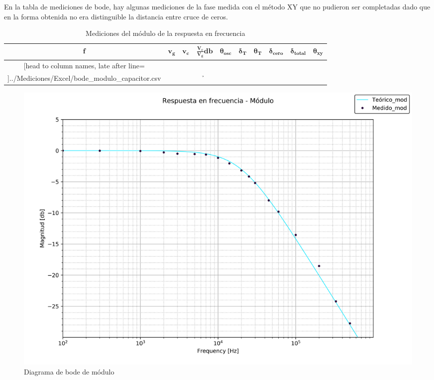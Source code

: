 En la tabla de mediciones de bode, hay algunas mediciones de la fase medida con el m\'etodo XY que no pudieron ser completadas dado que en la forma obtenida no era distinguible la distancia entre cruce de ceros.

\begin{table}[H]
	\centering
	\begin{tabular}{c c c c c c c c c c}%
		$\bm{f}$ & $\bm{v_{g}}$ & $\bm{v_{c}}$ & $\bm{\frac{V_c}{V_g}db}$ & $\bm{\theta_{osc}}$ & $\bm{\delta_{T}}$ & $\bm{\theta_{T}}$ & $\bm{\delta_{cero}}$ & $\bm{\delta_{total}}$ & $\bm{\theta_{xy}}$ \\ \hline
		\csvreader[head to column names, late after line=\\]{../Mediciones/Excel/bode_modulo_capacitor.csv}{}{\frec & \vg & \vc & \h & \osc & \delta & \tiempo & \ceros & \total & \xy}
		\hline
	\end{tabular}
	\label{mediciones_bode}
	\caption{Mediciones del m\'odulo de la respuesta en frecuencia}
\end{table}

\begin{figure}[H]
	\begin{center}
		\includegraphics[scale=0.6]{../Desarrollo/bode_modulo.png}
	\end{center}
	\caption{Diagrama de bode de m\'odulo}
	\label{fig:bode_modulo}
\end{figure}

